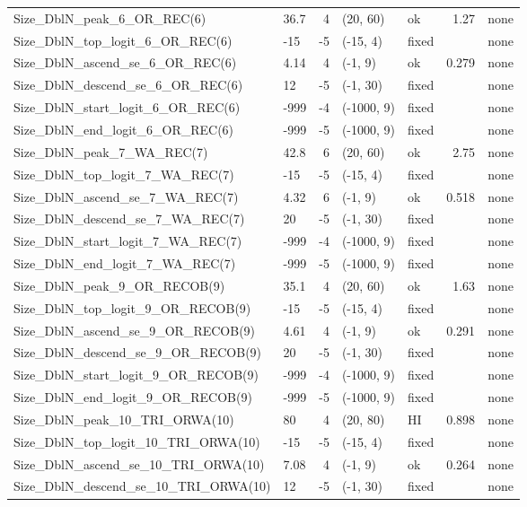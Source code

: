 \documentclass[
]{scrartcl}
\begin{document}
\begin{landscape}
\begin{longtable}{llrllrl}
Size\_DblN\_peak\_6\_OR\_REC(6) & 36.7 & 4 & (20, 60) & ok & 1.27 & none \\ 
Size\_DblN\_top\_logit\_6\_OR\_REC(6) & -15 & -5 & (-15, 4) & fixed &  & none \\ 
Size\_DblN\_ascend\_se\_6\_OR\_REC(6) & 4.14 & 4 & (-1, 9) & ok & 0.279 & none \\ 
Size\_DblN\_descend\_se\_6\_OR\_REC(6) & 12 & -5 & (-1, 30) & fixed &  & none \\ 
Size\_DblN\_start\_logit\_6\_OR\_REC(6) & -999 & -4 & (-1000, 9) & fixed &  & none \\ 
Size\_DblN\_end\_logit\_6\_OR\_REC(6) & -999 & -5 & (-1000, 9) & fixed &  & none \\ 
Size\_DblN\_peak\_7\_WA\_REC(7) & 42.8 & 6 & (20, 60) & ok & 2.75 & none \\ 
Size\_DblN\_top\_logit\_7\_WA\_REC(7) & -15 & -5 & (-15, 4) & fixed &  & none \\ 
Size\_DblN\_ascend\_se\_7\_WA\_REC(7) & 4.32 & 6 & (-1, 9) & ok & 0.518 & none \\ 
Size\_DblN\_descend\_se\_7\_WA\_REC(7) & 20 & -5 & (-1, 30) & fixed &  & none \\ 
Size\_DblN\_start\_logit\_7\_WA\_REC(7) & -999 & -4 & (-1000, 9) & fixed &  & none \\ 
Size\_DblN\_end\_logit\_7\_WA\_REC(7) & -999 & -5 & (-1000, 9) & fixed &  & none \\ 
Size\_DblN\_peak\_9\_OR\_RECOB(9) & 35.1 & 4 & (20, 60) & ok & 1.63 & none \\ 
Size\_DblN\_top\_logit\_9\_OR\_RECOB(9) & -15 & -5 & (-15, 4) & fixed &  & none \\ 
Size\_DblN\_ascend\_se\_9\_OR\_RECOB(9) & 4.61 & 4 & (-1, 9) & ok & 0.291 & none \\ 
Size\_DblN\_descend\_se\_9\_OR\_RECOB(9) & 20 & -5 & (-1, 30) & fixed &  & none \\ 
Size\_DblN\_start\_logit\_9\_OR\_RECOB(9) & -999 & -4 & (-1000, 9) & fixed &  & none \\ 
Size\_DblN\_end\_logit\_9\_OR\_RECOB(9) & -999 & -5 & (-1000, 9) & fixed &  & none \\ 
Size\_DblN\_peak\_10\_TRI\_ORWA(10) & 80 & 4 & (20, 80) & HI & 0.898 & none \\ 
Size\_DblN\_top\_logit\_10\_TRI\_ORWA(10) & -15 & -5 & (-15, 4) & fixed &  & none \\ 
Size\_DblN\_ascend\_se\_10\_TRI\_ORWA(10) & 7.08 & 4 & (-1, 9) & ok & 0.264 & none \\ 
Size\_DblN\_descend\_se\_10\_TRI\_ORWA(10) & 12 & -5 & (-1, 30) & fixed &  & none \\ 

\end{longtable}
\end{landscape}
\end{document}
